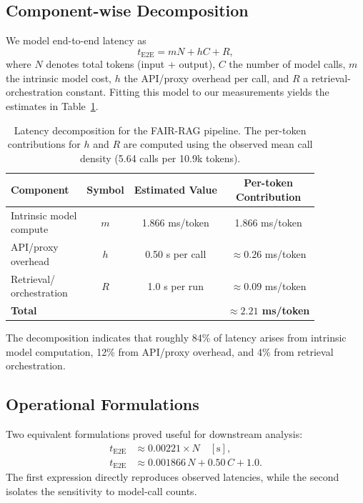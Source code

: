 \documentclass[11pt]{article}
\begin{document}
\subsection{Component-wise Decomposition}

We model end-to-end latency as
\begin{equation}
  t_{\mathrm{E2E}} = mN + hC + R,
\end{equation}
where $N$ denotes total tokens (input + output), $C$ the number of model calls, $m$ the intrinsic model cost, $h$ the API/proxy overhead per call, and $R$ a retrieval-orchestration constant. Fitting this model to our measurements yields the estimates in Table~\ref{tab:latency-decomp}.

\begin{table}[t]
\centering
\small
\begingroup
\setlength{\tabcolsep}{8pt}
\begin{tabular}{lccc}
\hline
  {\bfseries Component} & {\bfseries Symbol} & {\bfseries Estimated Value} & \shortstack{{\bfseries Per-token}\\{\bfseries Contribution}} \\
\hline
\shortstack{Intrinsic model\\compute} & $m$ & 1.866 ms/token & 1.866 ms/token \\
\shortstack{API/proxy\\overhead} & $h$ & 0.50 s per call & $\approx 0.26$ ms/token \\
\shortstack{Retrieval/\\orchestration} & $R$ & 1.0 s per run & $\approx 0.09$ ms/token \\
  {\bfseries Total} & & & {\bfseries $\approx 2.21$ ms/token} \\
\hline
\end{tabular}
\endgroup
\caption{Latency decomposition for the FAIR-RAG pipeline. The per-token contributions for $h$ and $R$ are computed using the observed mean call density (5.64 calls per 10.9k tokens).}
\label{tab:latency-decomp}
\end{table}

The decomposition indicates that roughly 84\% of latency arises from intrinsic model computation, 12\% from API/proxy overhead, and 4\% from retrieval orchestration.

\subsection{Operational Formulations}

Two equivalent formulations proved useful for downstream analysis:
\begin{align}
  t_{\mathrm{E2E}} &\approx 0.00221 \times N \quad [\mathrm{s}], \\
  t_{\mathrm{E2E}} &\approx 0.001866\,N + 0.50\,C + 1.0.
\end{align}
The first expression directly reproduces observed latencies, while the second isolates the sensitivity to model-call counts.
\end{document}
